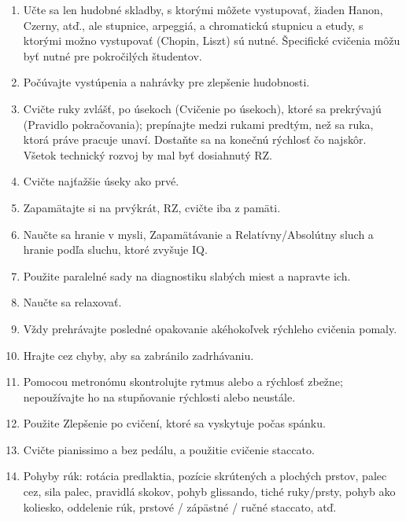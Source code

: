 \documentclass[11pt,a4paper]{book}
\begin{document}
\begin{enumerate}
\item Učte sa len hudobné skladby, s ktorými môžete vystupovať, žiaden Hanon, Czerny, atď., ale stupnice, arpeggiá, a chromatickú stupnicu a etudy, s ktorými možno vystupovať (Chopin, Liszt) sú nutné. Špecifické cvičenia môžu byť nutné pre pokročilých študentov.

\item Počúvajte vystúpenia a nahrávky pre zlepšenie hudobnosti.

\item Cvičte ruky zvlášť, po úsekoch (Cvičenie po úsekoch), ktoré sa prekrývajú (Pravidlo pokračovania); prepínajte medzi rukami predtým, než sa ruka, ktorá práve pracuje unaví. Dostaňte sa na konečnú rýchlosť čo najskôr. Všetok technický rozvoj by mal byť dosiahnutý RZ.

\item Cvičte najťažšie úseky ako prvé.

\item Zapamätajte si na prvýkrát, RZ, cvičte iba z pamäti.

\item Naučte sa hranie v mysli, Zapamätávanie a Relatívny/Absolútny sluch a hranie podľa sluchu, ktoré zvyšuje IQ.

\item Použite paralelné sady na diagnostiku slabých miest a napravte ich.

\item Naučte sa relaxovať.

\item Vždy prehrávajte posledné opakovanie akéhokoľvek rýchleho cvičenia pomaly.

\item Hrajte cez chyby, aby sa zabránilo zadrhávaniu.

\item Pomocou metronómu skontrolujte rytmus alebo a rýchlosť zbežne; nepoužívajte ho na stupňovanie rýchlosti alebo neustále.

\item Použite Zlepšenie po cvičení, ktoré sa vyskytuje počas spánku. 

\item Cvičte pianissimo a bez pedálu, a použitie cvičenie staccato.

\item Pohyby rúk: rotácia predlaktia, pozície skrútených a plochých prstov, palec cez, sila palec, 
pravidlá skokov, pohyb glissando, tiché ruky/prsty, pohyb ako koliesko, oddelenie rúk, prstové / zápästné / ručné staccato, atď.


\end{enumerate}
\end{document}
